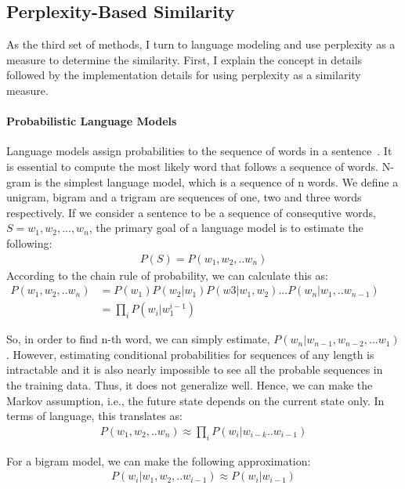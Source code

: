 \subsection{Perplexity-Based Similarity}

As the third set of methods, I turn to language modeling and use perplexity as a measure to determine the similarity. First, I explain the concept in details followed by the implementation details for using perplexity as a similarity measure.

\paragraph*{Probabilistic Language Models}

Language models assign probabilities to the sequence of words in a sentence~\citep{jurafsky2014speech}. It is essential to compute the most likely word that follows a sequence of words. N-gram is the simplest language model, which is a sequence of n words. We define a unigram, bigram and a trigram are sequences of one, two and three words respectively. If we consider a sentence to be a sequence of consequtive words,  $S = {w_1,w_2,...,w_n}$, the primary goal of a language model is to estimate the following:
\begin{align}
    P(S) = P(w_1,w_2,..w_n)
\end{align}
According to the chain rule of probability, we can calculate this as:
\begin{equation}
    \begin{aligned}
        P(w_1,w_2,..w_n) &= P(w_1)P(w_2|w_1)P(w3|w_1,w_2) ... P(w_n|w_1,..w_{n-1})&&\\
     &= \prod_i P(w_i|w_{1}^{i-1})&&
    \end{aligned}
\end{equation}

So, in order to find n-th word, we can simply estimate, $P(w_n|w_{n-1}, w_{n-2}, ... w_1)$. However, estimating conditional probabilities for sequences of any length is intractable and it is also nearly impossible to see all the probable sequences in the training data. Thus, it does not generalize well. Hence, we can make the Markov assumption, i.e., the future state depends on the current state only. In terms of language, this translates as:
\begin{align}
    P(w_1,w_2,..w_n) \approx \prod_i P(w_i|w_{i-k}..w_{i-1})
\end{align}

For a bigram model, we can make the following approximation:
\begin{align}
 P(w_i|w_1,w_2,..w_{i-1}) \approx P(w_i|w_{i-1})
\end{align}

